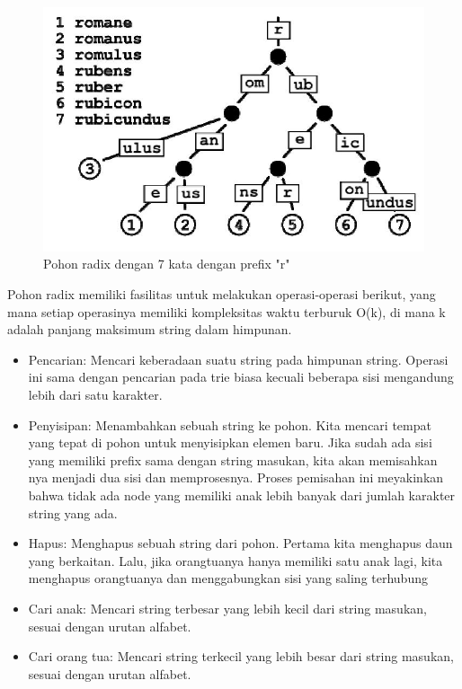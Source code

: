\begin{figure}[H]
\centering
\includegraphics[scale=0.75]{Gambar/contoh-radix-tree}
\caption[Trie]{Pohon radix dengan 7 kata dengan prefix "r"\cite{najogie:10:trie}} 
\label{contoh-radix-tree}
\end{figure}

Pohon radix memiliki fasilitas untuk melakukan operasi-operasi berikut, yang mana setiap operasinya memiliki kompleksitas waktu terburuk O(k), di mana k adalah panjang maksimum string dalam himpunan.

\begin{itemize}
	\item Pencarian: Mencari keberadaan suatu string pada himpunan string. Operasi ini sama dengan pencarian pada trie biasa kecuali beberapa sisi mengandung lebih dari satu karakter.
	\item Penyisipan: Menambahkan sebuah string ke pohon. Kita mencari tempat yang tepat di pohon untuk menyisipkan elemen baru. Jika sudah ada sisi yang memiliki prefix sama dengan string masukan, kita akan memisahkan nya menjadi dua sisi dan memprosesnya. Proses pemisahan ini meyakinkan bahwa tidak ada node yang memiliki anak lebih banyak dari jumlah karakter string yang ada.
	\item Hapus: Menghapus sebuah string dari pohon. Pertama kita menghapus daun yang berkaitan. Lalu, jika orangtuanya hanya memiliki satu anak lagi, kita menghapus orangtuanya dan menggabungkan sisi yang saling terhubung
	\item Cari anak: Mencari string terbesar yang lebih kecil dari string masukan, sesuai dengan urutan alfabet.
	\item Cari orang tua: Mencari string terkecil yang lebih besar dari string masukan, sesuai dengan urutan alfabet.
\end{itemize}

